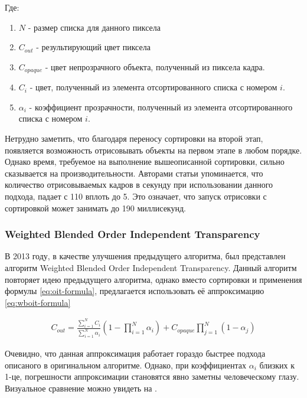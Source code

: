 			Где:
			\begin{enumerate}[1.]
				\item $N$ - размер списка для данного пиксела
				\item $C_{out}$ - результирующий цвет пиксела
				\item $C_{opaque}$ - цвет непрозрачного объекта, полученный из пиксела кадра.
				\item $C_{i}$ - цвет, полученный из элемента отсортированного списка с номером $i$.
				\item $\alpha_i$ - коэффициент прозрачности, полученный из элемента отсортированного списка с номером $i$.
			\end{enumerate}			
			
			Нетрудно заметить, что благодаря переносу сортировки на второй этап, появляется возможность отрисовывать объекты на первом этапе в любом порядке. Однако время, требуемое на выполнение вышеописанной сортировки, сильно сказывается на производительности. Авторами статьи упоминается, что количество отрисовываемых кадров в секунду при использовании данного подхода, падает с 110 вплоть до 5. Это означает, что запуск отрисовки с сортировкой может занимать до 190 миллисекунд.			
		\subsubsection{Weighted Blended Order Independent Transparency} \label{ch3:render_pass:transparents:wboit}
			В 2013 году, в качестве улучшения предыдущего алгоритма, был представлен алгоритм Weighted Blended Order Independent Transparency\cite{mcguire2013weighted}. Данный алгоритм повторяет идею предыдущего алгоритма, однако вместо сортировки и применения формулы \ref{eq:oit-formula}, предлагается использовать её аппроксимацию \ref{eq:wboit-formula}
					 
			\begin{equation}
				\label{eq:wboit-formula}
				\begin{multlined}	 
					C_{out} = \frac{\sum_{i=1}^{N}C_i}{\sum_{i=1}^{N}\alpha_i}(1 - \prod_{i=1}^{N}\alpha_i) + 
					C_{opaque}\prod _{j=1}^{N}(1 - \alpha_j)   
				\end{multlined}
			\end{equation}
			
			Очевидно, что данная аппроксимация работает гораздо быстрее подхода описаного в оригинальном алгоритме. Однако, при коэффициентах $\alpha_i$ близких к 1-це, погрешности аппроксимации становятся явно заметны человеческому глазу. Визуальное сравнение можно увидеть на .
			
